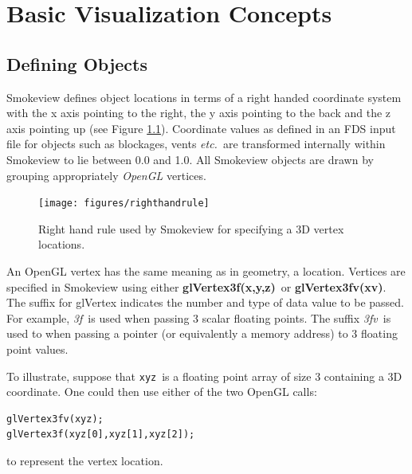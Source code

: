 \documentclass[11pt,twoside]{book}
\newcommand{\figoptions}{htp}
\begin{document}
%
%

\chapter{Basic Visualization Concepts}
\label{visoverview}
\section{Defining Objects} Smokeview defines object locations in terms of a right handed coordinate system with the x axis pointing to the right, the y axis pointing to the back and the z axis pointing up (see Figure \ref{figrighthand}).  Coordinate values as defined in an FDS input file for objects such as blockages, vents {\em etc.}\ are transformed internally within Smokeview to lie between 0.0 and 1.0.
All Smokeview objects are drawn by grouping appropriately {\em OpenGL} vertices.
\begin{figure}[\figoptions]
\begin{center}
\texttt{[image: figures/righthandrule]}
\end{center}
\caption{Right hand rule used by Smokeview for specifying a 3D vertex locations.}
\label{figrighthand}
\end{figure}

An OpenGL vertex has the same meaning as in geometry, a location.
Vertices are specified in Smokeview using either {\bf glVertex3f(x,y,z)}\ or {\bf glVertex3fv(xv)}.  The suffix for glVertex indicates the number and type of data value to be passed.  For example, {\em 3f}\ is used when passing 3 scalar floating points.  The suffix {\em 3fv}\ is used to when passing a pointer (or equivalently a memory address) to 3 floating point  values.

To illustrate, suppose that {\tt xyz}\ is a floating point array of size 3 containing a 3D coordinate.  One could then use either of the two OpenGL calls:
\begin{verbatim}
glVertex3fv(xyz);
glVertex3f(xyz[0],xyz[1],xyz[2]);
\end{verbatim}
to represent the vertex location.
\end{document}
